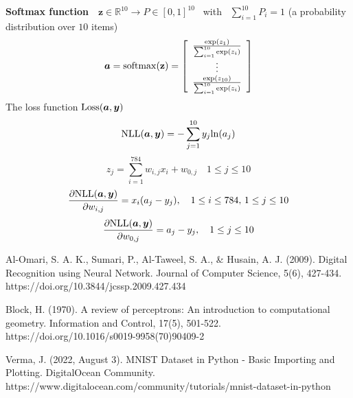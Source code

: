 \documentclass[11pt]{amsart}
\begin{document}
{\bf Softmax function} \,\, $\mathbf{z}\in \mathbb{R}^{10} \to P\in [0, 1]^{10}$ \, with \, $\sum_{i=1}^{10} P_i=1$ (a
probability distribution over $10$ items)
$$
\bm{a}={\rm softmax}(\mathbf{z})=\left[\begin{array}{c} \frac{{\rm exp}(z_1)}{\sum_{i=1}^{10} {\rm exp}(z_i)}\\ \vdots\\ \frac{{\rm exp}(z_{10})}{\sum_{i=1}^{10} {\rm exp}(z_i)}\end{array}\right]
$$
The loss function ${\rm Loss}(\bm{a}, \bm{y})$
$$
{\rm NLL}(\bm{a}, \bm{y})=-\sum_{j=1}^{10}y_j{\rm ln}(a_j)
$$
$$
z_j=\sum_{i=1}^{784}w_{i,j}x_i+w_{0,j} \quad 1\leq j\leq 10
$$
$$
\frac{\partial {\rm NLL} (\bm{a}, \bm{y})}{\partial w_{i, j}}=x_i(a_j-y_j), \quad 1\leq i\leq 784, \, 1\leq j\leq 10
$$
$$
\frac{\partial {\rm NLL} (\bm{a}, \bm{y})}{\partial w_{0, j}}=a_j-y_j, \quad 1\leq j\leq 10
$$




\vskip 1in

\begin{thebibliography}{10}
Al-Omari, S. A. K., Sumari, P., Al-Taweel, S. A., \& Husain, A. J. (2009). Digital Recognition using Neural Network. Journal of Computer Science, 5(6), 427-434. https://doi.org/10.3844/jcssp.2009.427.434

Block, H. (1970). A review of perceptrons: An introduction to computational geometry. Information and Control, 17(5), 501-522. https://doi.org/10.1016/s0019-9958(70)90409-2

Verma, J. (2022, August 3). MNIST Dataset in Python - Basic Importing and Plotting. DigitalOcean Community. https://www.digitalocean.com/community/tutorials/mnist-dataset-in-python
\end{thebibliography}
\end{document}
